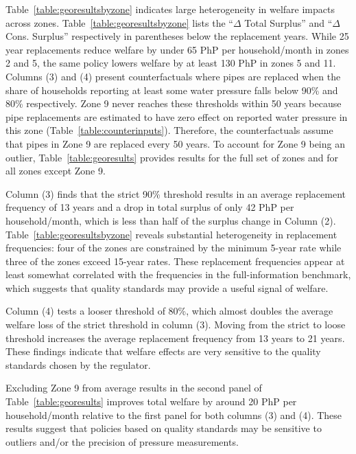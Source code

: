 \documentclass[12pt,table]{article}
\begin{document}
Table~\ref{table:georesultsbyzone} indicates large heterogeneity in welfare impacts across zones.  Table~\ref{table:georesultsbyzone} lists the ``$\Delta$ Total Surplus'' and ``$\Delta$ Cons. Surplus'' respectively in parentheses below the replacement years.  While 25 year replacements reduce welfare by under 65 PhP per household/month in zones 2 and 5, the same policy lowers welfare by at least 130 PhP in zones 5 and 11.  Columns (3) and (4) present counterfactuals where pipes are replaced when the share of households reporting at least some water pressure falls below 90\% and 80\% respectively.  Zone 9 never reaches these thresholds within 50 years because pipe replacements are estimated to have zero effect on reported water pressure in this zone (Table~\ref{table:counterinputs}).  Therefore, the counterfactuals assume that pipes in Zone 9 are replaced every 50 years.  To account for Zone 9 being an outlier, Table~\ref{table:georesults} provides results for the full set of zones and for all zones except Zone 9.  

Column (3) finds that the strict 90\% threshold results in an average replacement frequency of 13 years and a drop in total surplus of only 42 PhP per household/month, which is less than half of the surplus change in Column (2).  Table~\ref{table:georesultsbyzone} reveals substantial heterogeneity in replacement frequencies: four of the zones are constrained by the minimum 5-year rate while three of the zones exceed 15-year rates.  These replacement frequencies appear at least somewhat correlated with the frequencies in the full-information benchmark, which suggests that quality standards may provide a useful signal of welfare.

Column (4) tests a looser threshold of 80\%, which almost doubles the average welfare loss of the strict threshold in column (3).  Moving from the strict to loose threshold increases the average replacement frequency from 13 years to 21 years.  These findings indicate that welfare effects are very sensitive to the quality standards chosen by the regulator.

Excluding Zone 9 from average results in the second panel of Table~\ref{table:georesults} improves total welfare by around 20 PhP per household/month relative to the first panel for both columns (3) and (4).  These results suggest that policies based on quality standards may be sensitive to outliers and/or the precision of pressure measurements. 
\end{document}
